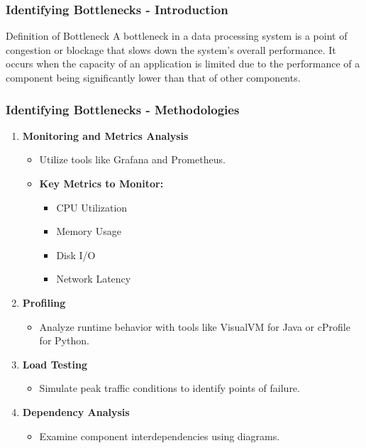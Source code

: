 \documentclass[aspectratio=169]{beamer}
\begin{document}
\begin{frame}[fragile]
    \frametitle{Identifying Bottlenecks - Introduction}
    \begin{block}{Definition of Bottleneck}
        A bottleneck in a data processing system is a point of congestion or blockage that slows down the system's overall performance.
        It occurs when the capacity of an application is limited due to the performance of a component being significantly lower than that of other components.
    \end{block}
\end{frame}

\begin{frame}[fragile]
    \frametitle{Identifying Bottlenecks - Methodologies}
    \begin{enumerate}
        \item \textbf{Monitoring and Metrics Analysis}
        \begin{itemize}
            \item Utilize tools like Grafana and Prometheus.
            \item \textbf{Key Metrics to Monitor:}
            \begin{itemize}
                \item CPU Utilization
                \item Memory Usage
                \item Disk I/O
                \item Network Latency
            \end{itemize}
        \end{itemize}

        \item \textbf{Profiling}
        \begin{itemize}
            \item Analyze runtime behavior with tools like VisualVM for Java or cProfile for Python.
        \end{itemize}

        \item \textbf{Load Testing}
        \begin{itemize}
            \item Simulate peak traffic conditions to identify points of failure.
        \end{itemize}

        \item \textbf{Dependency Analysis}
        \begin{itemize}
            \item Examine component interdependencies using diagrams.
        \end{itemize}
    \end{enumerate}
\end{frame}
\end{document}

